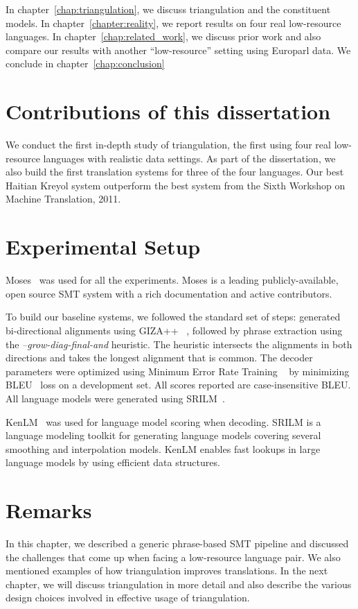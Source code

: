 In chapter~\ref{chap:triangulation}, we discuss triangulation and the constituent models. In chapter~\ref{chapter:reality}, we report results on four real low-resource languages. In chapter~\ref{chap:related_work}, we discuss prior work and also compare our results with another ``low-resource'' setting using Europarl data. We conclude in chapter~\ref{chap:conclusion}

\section{Contributions of this dissertation}
\label{sec:summary}
We conduct the first in-depth study of triangulation, the first using four real low-resource languages with realistic data settings. As part of the dissertation, we also build the first translation systems for three of the four languages. Our best Haitian Kreyol system outperform the best system from the Sixth Workshop on Machine Translation, 2011. 


\section{Experimental Setup}
\label{sec:setup}


Moses~\cite{Koehn:07} was used for all the experiments. Moses is a leading publicly-available, open source SMT system with a rich documentation and active contributors. 

To build our baseline systems, we followed the standard set of steps: generated bi-directional alignments using GIZA++ ~\cite{OchNey:03}, followed by phrase extraction using the \emph{--grow-diag-final-and} heuristic. The heuristic intersects the alignments in both directions and takes the longest alignment that is common. The decoder parameters were optimized using Minimum Error Rate Training ~\cite{Och:03} by minimizing BLEU~\cite{Papineni:02} loss on a development set. All scores reported are case-insensitive BLEU. All language models were generated using SRILM~\cite{Stolcke:02}.

KenLM~\cite{Ken:11} was used for language model scoring when decoding. SRILM is a language modeling toolkit for generating language models covering several smoothing and interpolation models. KenLM enables fast lookups in large language models by using efficient data structures.  

\section{Remarks}
	In this chapter, we described a generic phrase-based SMT pipeline and discussed the challenges that come up when facing a low-resource language pair. We also mentioned examples of how triangulation improves translations. In the next chapter, we will discuss triangulation in more detail and also describe the various design choices involved in effective usage of triangulation. 
